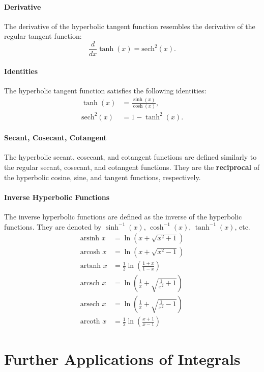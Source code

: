 \documentclass[11pt]{report}
\begin{document}
\paragraph{Derivative} The derivative of the hyperbolic tangent function resembles the derivative of the regular tangent function:
\begin{equation} \frac{d}{dx} \tanh(x) = \text{sech}^2(x). \end{equation}
\paragraph{Identities} The hyperbolic tangent function satisfies the following identities:
\begin{align}
    \tanh(x) &= \frac{\sinh(x)}{\cosh(x)}, \\
    \text{sech}^2(x) &= 1 - \tanh^2(x).
\end{align}
\paragraph{Secant, Cosecant, Cotangent} The hyperbolic secant, cosecant, and cotangent functions are defined similarly to the regular secant, cosecant, and cotangent functions. They are the \textbf{reciprocal} of the hyperbolic cosine, sine, and tangent functions, respectively.
\paragraph{Inverse Hyperbolic Functions} The inverse hyperbolic functions are defined as the inverse of the hyperbolic functions. They are denoted by $\sinh^{-1}(x)$, $\cosh^{-1}(x)$, $\tanh^{-1}(x)$, etc.
\begin{align}
    \text{arsinh } x &= \ln\left(x + \sqrt{x^2 + 1}\right) \\[10pt]
    \text{arcosh } x &= \ln\left(x + \sqrt{x^2 - 1}\right) \\[10pt]
    \text{artanh } x &= \frac{1}{2} \ln\left(\frac{1 + x}{1 - x}\right) \\[10pt]
    \text{arcsch } x &= \ln\left(\frac{1}{x} + \sqrt{\frac{1}{x^2} + 1}\right) \\[10pt]
    \text{arsech } x &= \ln\left(\frac{1}{x} + \sqrt{\frac{1}{x^2} - 1}\right) \\[10pt]
    \text{arcoth } x &= \frac{1}{2} \ln\left(\frac{x + 1}{x - 1}\right)
\end{align}
\section{Further Applications of Integrals}
\end{document}
